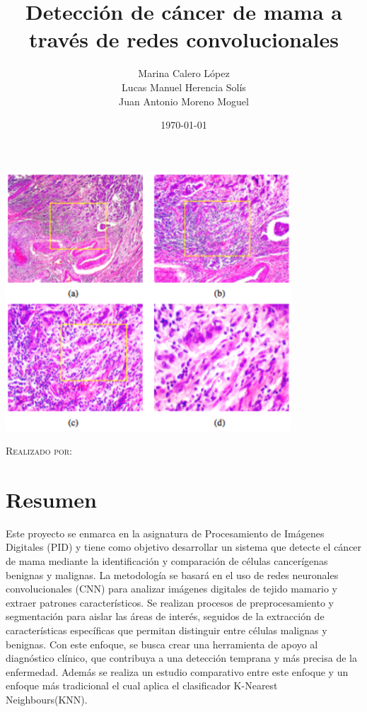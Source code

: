 \documentclass[12pt]{article} %
\title{Detección de cáncer de mama a través de redes convolucionales}
\author{Marina Calero López \\
Lucas Manuel Herencia Solís \\
Juan Antonio Moreno Moguel \\
}
\date{\today}
\newcommand{\customtitlefont}{\fontsize{40pt}{42pt}\selectfont\bfseries} %
\begin{document}
\begin{titlepage}
    \centering
    {\customtitlefont \thetitle \par} %
    \vspace{2cm}
    \includegraphics[width=0.8\textwidth]{logo.png}\par\vspace{1cm} %
    {\scshape\Large Realizado por:\par}
    \vspace{1cm}
    {\Large \theauthor\par}
    \vfill
    {\large \thedate\par}
\end{titlepage}

\section*{Resumen}
Este proyecto se enmarca en la asignatura de Procesamiento de Imágenes Digitales (PID) y tiene como objetivo desarrollar un sistema que detecte el cáncer de mama mediante la identificación y comparación de células cancerígenas benignas y malignas. La metodología se basará en el uso de redes neuronales convolucionales (CNN) para analizar imágenes digitales de tejido mamario y extraer patrones característicos. Se realizan procesos de preprocesamiento y segmentación para aislar las áreas de interés, seguidos de la extracción de características específicas que permitan distinguir entre células malignas y benignas. Con este enfoque, se busca crear una herramienta de apoyo al diagnóstico clínico, que contribuya a una detección temprana y más precisa de la enfermedad. Además se realiza un estudio comparativo entre este enfoque y un enfoque más tradicional el cual aplica el clasificador K-Nearest Neighbours(KNN).
\end{document}
